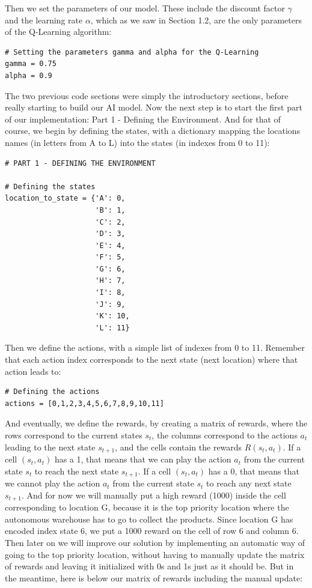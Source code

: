 \documentclass[]{book}
\begin{document}
Then we set the parameters of our model. These include the discount factor \(\gamma\) and the learning rate \(\alpha\), which as we saw in Section 1.2, are the only parameters of the Q-Learning algorithm:

\begin{lstlisting}
# Setting the parameters gamma and alpha for the Q-Learning
gamma = 0.75
alpha = 0.9
\end{lstlisting}

The two previous code sections were simply the introductory sections, before really starting to build our AI model. Now the next step is to start the first part of our implementation: Part 1 - Defining the Environment. And for that of course, we begin by defining the states, with a dictionary mapping the locations names (in letters from A to L) into the states (in indexes from 0 to 11):

\begin{lstlisting}
# PART 1 - DEFINING THE ENVIRONMENT

# Defining the states
location_to_state = {'A': 0,
                     'B': 1,
                     'C': 2,
                     'D': 3,
                     'E': 4,
                     'F': 5,
                     'G': 6,
                     'H': 7,
                     'I': 8,
                     'J': 9,
                     'K': 10,
                     'L': 11}
\end{lstlisting}

Then we define the actions, with a simple list of indexes from 0 to 11. Remember that each action index corresponds to the next state (next location) where that action leads to:

\begin{lstlisting}
# Defining the actions
actions = [0,1,2,3,4,5,6,7,8,9,10,11]
\end{lstlisting}

And eventually, we define the rewards, by creating a matrix of rewards, where the rows correspond to the current states \(s_t\), the columns correspond to the actions \(a_t\) leading to the next state \(s_{t+1}\), and the cells contain the rewards \(R(s_t,a_t)\). If a cell \((s_t,a_t)\) has a 1, that means that we can play the action \(a_t\) from the current state \(s_t\) to reach the next state \(s_{t+1}\). If a cell \((s_t,a_t)\) has a 0, that means that we cannot play the action \(a_t\) from the current state \(s_t\) to reach any next state \(s_{t+1}\). And for now we will manually put a high reward (1000) inside the cell corresponding to location G, because it is the top priority location where the autonomous warehouse has to go to collect the products. Since location G has encoded index state 6, we put a 1000 reward on the cell of row 6 and column 6. Then later on we will improve our solution by implementing an automatic way of going to the top priority location, without having to manually update the matrix of rewards and leaving it initialized with 0s and 1s just as it should be. But in the meantime, here is below our matrix of rewards including the manual update:
\end{document}
